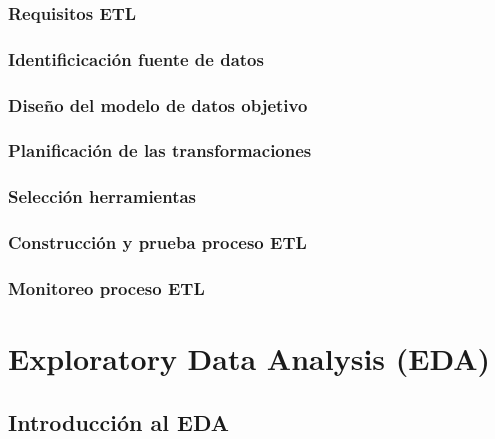 \documentclass[letterpaper, 12pt]{report}
\begin{document}
\subsection{Requisitos ETL}


\subsection{Identificicación fuente de datos}


\subsection{Diseño del modelo de datos objetivo}


\subsection{Planificación de las transformaciones}


\subsection{Selección herramientas}


\subsection{Construcción y prueba proceso ETL}


\subsection{Monitoreo proceso ETL}


\chapter{Exploratory Data Analysis (EDA)}



\section{Introducción al EDA}

\end{document}
